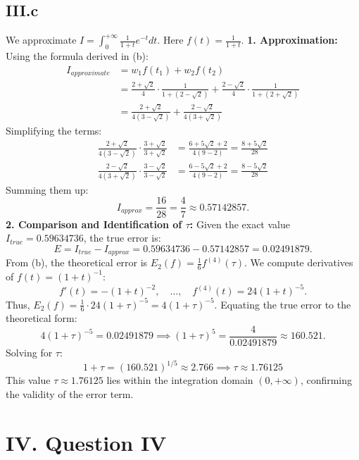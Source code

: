 \documentclass[a4paper]{article}
\begin{document}
\subsection*{III.c}
We approximate $I = \int_{0}^{+\infty} \frac{1}{1+t} e^{-t} dt$. Here $f(t) = \frac{1}{1+t}$.
\textbf{1. Approximation:}
Using the formula derived in (b):
\begin{align*}
I_{approximate} &= w_1 f(t_1) + w_2 f(t_2) \\
&= \frac{2+\sqrt{2}}{4} \cdot \frac{1}{1 + (2-\sqrt{2})} + \frac{2-\sqrt{2}}{4} \cdot \frac{1}{1 + (2+\sqrt{2})} \\
&= \frac{2+\sqrt{2}}{4(3-\sqrt{2})} + \frac{2-\sqrt{2}}{4(3+\sqrt{2})}
\end{align*}
Simplifying the terms:
\begin{align*}
\frac{2+\sqrt{2}}{4(3-\sqrt{2})} \cdot \frac{3+\sqrt{2}}{3+\sqrt{2}} &= \frac{6 + 5\sqrt{2} + 2}{4(9-2)} = \frac{8+5\sqrt{2}}{28} \\
\frac{2-\sqrt{2}}{4(3+\sqrt{2})} \cdot \frac{3-\sqrt{2}}{3-\sqrt{2}} &= \frac{6 - 5\sqrt{2} + 2}{4(9-2)} = \frac{8-5\sqrt{2}}{28}
\end{align*}
Summing them up:
\[
I_{approx} = \frac{16}{28} = \frac{4}{7} \approx 0.57142857.
\]
\textbf{2. Comparison and Identification of $\tau$:}
Given the exact value $I_{true} = 0.59634736$, the true error is:
\[
E = I_{true} - I_{approx} = 0.59634736 - 0.57142857 = 0.02491879.
\]
From (b), the theoretical error is $E_2(f) = \frac{1}{6} f^{(4)}(\tau)$.
We compute derivatives of $f(t) = (1+t)^{-1}$:
\[
f'(t) = -(1+t)^{-2}, \quad \dots, \quad f^{(4)}(t) = 24(1+t)^{-5}.
\]
Thus, $E_2(f) = \frac{1}{6} \cdot 24(1+\tau)^{-5} = 4(1+\tau)^{-5}$.
Equating the true error to the theoretical form:
\[
4(1+\tau)^{-5} = 0.02491879 \implies (1+\tau)^5 = \frac{4}{0.02491879} \approx 160.521.
\]
Solving for $\tau$:
\[
1+\tau = (160.521)^{1/5} \approx 2.766 \implies \tau \approx 1.76125
\]
This value $\tau \approx 1.76125$ lies within the integration domain $(0, +\infty)$, confirming the validity of the error term.



\section*{IV. Question IV}
\end{document}
